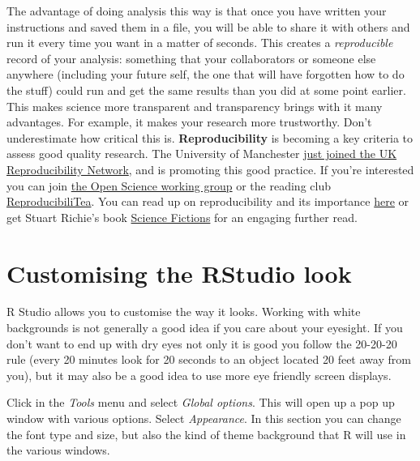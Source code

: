 \documentclass[
]{book}
\begin{document}
The advantage of doing analysis this way is that once you have written your instructions and saved them in a file, you will be able to share it with others and run it every time you want in a matter of seconds. This creates a \emph{reproducible} record of your analysis: something that your collaborators or someone else anywhere (including your future self, the one that will have forgotten how to do the stuff) could run and get the same results than you did at some point earlier. This makes science more transparent and transparency brings with it many advantages. For example, it makes your research more trustworthy. Don't underestimate how critical this is. \textbf{Reproducibility} is becoming a key criteria to assess good quality research. The University of Manchester \href{https://www.staffnet.manchester.ac.uk/news/display/?id=25496}{just joined the UK Reproducibility Network}, and is promoting this good practice. If you're interested you can join \href{https://research-it.manchester.ac.uk/news/2019/05/30/uom-open-science-working-group/}{the Open Science working group} or the reading club \href{https://reproducibilitea.org/journal-clubs/\#Manchester}{ReproducibiliTea}. You can read up on reproducibility and its importance \href{http://theconversation.com/the-science-reproducibility-crisis-and-what-can-be-done-about-it-74198}{here} or get Stuart Richie's book \href{https://www.goodreads.com/book/show/52199285-science-fictions}{Science Fictions} for an engaging further read.

\hypertarget{customising-the-rstudio-look}{%
\section{Customising the RStudio look}\label{customising-the-rstudio-look}}

R Studio allows you to customise the way it looks. Working with white backgrounds is not generally a good idea if you care about your eyesight. If you don't want to end up with dry eyes not only it is good you follow the 20-20-20 rule (every 20 minutes look for 20 seconds to an object located 20 feet away from you), but it may also be a good idea to use more eye friendly screen displays.

Click in the \emph{Tools} menu and select \emph{Global options}. This will open up a pop up window with various options. Select \emph{Appearance}. In this section you can change the font type and size, but also the kind of theme background that R will use in the various windows.
\end{document}
